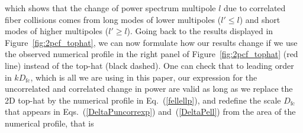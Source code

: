                                                                                                                                                                                                                                                                             \eeqa
                                                                                                                                                                                                                                                                            which shows that the change of power spectrum multipole $l$ due to correlated 
                                                                                                                                                                                                                                                                            fiber collisions comes from long modes of lower multipoles ($l'\leq l$) and 
                                                                                                                                                                                                                                                                            short modes of higher multipoles ($l'\geq l$). Going back to the results 
                                                                                                                                                                                                                                                                            displayed in Figure~\ref{fig:2pcf_tophat}, we can now formulate how our results 
                                                                                                                                                                                                                                                                            change if we use the observed numerical profile in the right panel of 
                                                                                                                                                                                                                                                                            Figure~\ref{fig:2pcf_tophat} (red line) instead of the top-hat (black dashed). 
                                                                                                                                                                                                                                                                            One can check that to leading order in $k D_\mathrm{fc}$, which is all we are using in this paper, our expression for the uncorrelated and correlated change in power are valid as long as we replace the 2D top-hat by the numerical profile in Eq.~(\ref{fellellp}), and redefine the scale $D_\mathrm{fc}$ that appears in Eqs.~(\ref{DeltaPuncorrexp}) and~(\ref{DeltaPell}) from the area of the numerical profile, that is 
